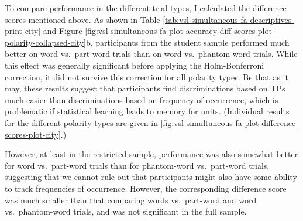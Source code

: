 \documentclass[
]{article}
\begin{document}
To compare performance in the different trial types, I calculated the
difference scores mentioned above. As shown in Table
\ref{tab:vsl-simultaneous-fa-descriptives-print-city} and Figure
\ref{fig:vsl-simultaneous-fa-plot-accuracy-diff-scores-plot-polarity-collapsed-city}b,
participants from the student sample performed much better on word
vs.~part-word trials than on word vs.~phantom-word trials. While this
effect was generally significant before applying the Holm-Bonferroni
correction, it did not survive this correction for all polarity types.
Be that as it may, these results suggest that participants find
discriminations based on TPs much easier than discriminations based on
frequency of occurrence, which is problematic if statistical learning
leads to memory for units. (Individual results for the different
polarity types are given in
\ref{fig:vsl-simultaneous-fa-plot-difference-scores-plot-city}.)

However, at least in the restricted sample, performance was also
somewhat better for word vs.~part-word trials than for phantom-word
vs.~part-word trials, suggesting that we cannot rule out that
participants might also have some ability to track frequencies of
occurrence. However, the corresponding difference score was much smaller
than that comparing words vs.~part-word and word vs.~phantom-word
trials, and was not significant in the full sample.
\end{document}
